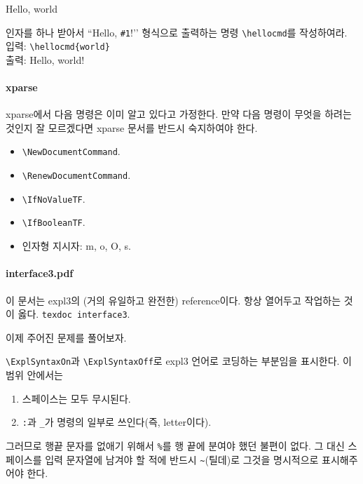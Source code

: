 \documentclass[a4paper,amsmath,itemph]{oblivoir}
\newcommand\pkg[1]{\textsf{#1}}
\begin{document}
\begin{intro}
Hello, world
\end{intro}

\begin{tcolorbox}[title={문제},fonttitle={\sffamily\bfseries}]
인자를 하나 받아서 ``Hello, \verb|#1|!’’ 형식으로 출력하는 명령 \verb|\hellocmd|를 작성하여라.
\tcblower 
입력: \verb|\hellocmd{world}|\\
출력: Hello, world!
\end{tcolorbox}


\paragraph{\pkg{xparse}}
\pkg{xparse}에서 다음 명령은 이미 알고 있다고 가정한다. 만약 다음 명령이 무엇을 하려는 것인지 잘 모르겠다면 xparse 문서를 반드시 숙지하여야 한다.
\begin{itemize}\firmlist
\item \verb|\NewDocumentCommand|.
\item \verb|\RenewDocumentCommand|.
\item \verb|\IfNoValueTF|.
\item \verb|\IfBooleanTF|.
\item 인자형 지시자: \textsf{m, o, O, s}.
\end{itemize}

\paragraph{interface3.pdf}

이 문서는 expl3의 (거의 유일하고 완전한) reference이다. 항상 열어두고 작업하는 것이 옳다. \verb|texdoc interface3|.


\bigskip

이제 주어진 문제를 풀어보자.

\medskip


\verb|\ExplSyntaxOn|과 \verb|\ExplSyntaxOff|로 expl3 언어로 코딩하는 부분임을 표시한다. 이 범위 안에서는
\begin{enumerate}\firmlist
\item 스페이스는 모두 무시된다.
\item \verb|:|과 \verb|_|가 명령의 일부로 쓰인다(즉, letter이다).
\end{enumerate}
그러므로 행끝 문자를 없애기 위해서 \verb|%|를 행 끝에 분여야 했던 불편이 없다.
그 대신 스페이스를 입력 문자열에 남겨야 할 적에 반드시 \verb|~|(틸데)로 그것을 명시적으로 표시해주어야 한다.
\end{document}
